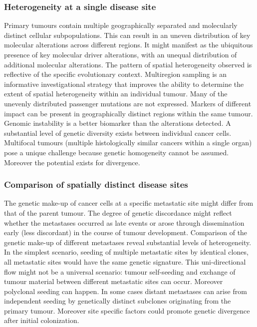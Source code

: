 		\subsubsection{Heterogeneity at a single disease site}
		Primary tumours contain multiple geographically separated and molecularly distinct cellular subpopulations.
		This can result in an uneven distribution of key molecular alterations across different regions.
		It might manifest as the ubiquitous presence of key molecular driver alterations, with an unequal distribution of additional molecular alterations.
		The pattern of spatial heterogeneity observed is reflective of the specific evolutionary context.
		Multiregion sampling is an informative investigational strategy that improves the ability to determine the extent of spatial heterogeneity within an individual tumour.
		Many of the unevenly distributed passenger mutations are not expressed.
		Markers of different impact can be present in geographically distinct regions within the same tumour.
		Genomic instability is a better biomarker than the alterations detected.
		A substantial level of genetic diversity exists between individual cancer cells.
		Multifocal tumours (multiple histologically similar cancers within a single organ) pose a unique challenge because genetic homogeneity cannot be assumed.
		Moreover the potential exists for divergence.

		\subsubsection{Comparison of spatially distinct disease sites}
		The genetic make-up of cancer cells at a specific metastatic site might differ from that of the parent tumour.
		The degree of genetic discordance might reflect whether the metastases occurred as late events or arose through dissemination early (less discordant) in the course of tumour development.
		Comparison of the genetic make-up of different metastases reveal substantial levels of heterogeneity.
		In the simplest scenario, seeding of multiple metastatic sites by identical clones, all metastatic sites would have the same genetic signature.
		This uni-directional flow might not be a universal scenario: tumour self-seeding and exchange of tumour material between different metastatic sites can occur.
		Moreover polyclonal seeding can happen.
		In some cases distant metastases can arise from independent seeding by genetically distinct subclones originating from the primary tumour.
		Moreover site specific factors could promote genetic divergence after initial colonization.

